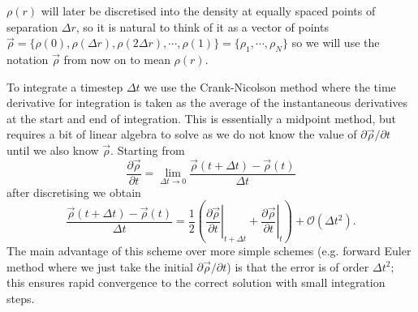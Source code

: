 \documentclass[12pt,twoside]{report}
\begin{document}
$\rho(r)$ will later be discretised into the density at equally spaced points of separation $\Delta r$, so it is natural to think of it as a vector of points $\vec{\rho} = \{\rho(0), \rho(\Delta r), \rho(2 \Delta r), \cdots, \rho(1)\} = \{\rho_1, \cdots, \rho_N\}$ so we will use the notation $\vec{\rho}$ from
now on to mean $\rho(r)$.

To integrate a timestep $\Delta t$ we use the Crank-Nicolson \cite{Crank1947} method where the time derivative for integration is taken as the average of the instantaneous derivatives at the start and end of integration.
This is essentially a midpoint method, but requires a bit of linear algebra to solve as we do not know the value of $\partial \vec{\rho} / \partial t$ until we also know $\vec{\rho}$.
Starting from
\begin{equation}
  \frac{\partial \vec{\rho}}{\partial t} =
  \lim_{\Delta t \to 0} \frac{\vec{\rho}(t + \Delta t) - \vec{\rho}(t)}{\Delta t}
\end{equation}
after discretising we obtain
\begin{equation}
  \frac{\vec{\rho}(t + \Delta t) - \vec{\rho}(t)}{\Delta t}
  =
  \frac{1}{2}
  \left(
  \left. \frac{\partial \vec{\rho}}{\partial t} \right|_{t + \Delta t}
  +
  \left. \frac{\partial \vec{\rho}}{\partial t} \right|_t
  \right)
  + \mathcal{O}(\Delta t^2).
\end{equation}
The main advantage of this scheme over more simple schemes (e.g. forward Euler method where we just take the initial $\partial \vec{\rho} / \partial t$) is that the error is of order $\Delta t^2$; this ensures rapid convergence to the correct solution with small integration steps.
\end{document}
